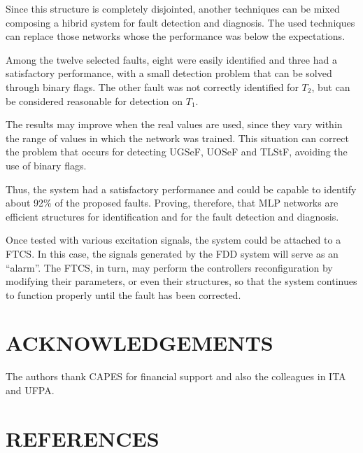 \documentclass[10pt,fleqn,a4paper]{article}
\begin{document}
Since this structure is completely disjointed, another techniques can be mixed
composing a hibrid system for fault detection and diagnosis. The used techniques
can replace those networks whose the performance was below the expectations.

Among the twelve selected faults, eight were easily identified and three had a
satisfactory performance, with a small detection problem that can be solved
through binary flags. The other fault was not correctly identified for $T_2$,
but can be considered reasonable for detection on $T_1$.

The results may improve when the real values are used, since they vary within
the range of values in which the network was trained. This situation can correct
the problem that occurs for detecting UGSeF, UOSeF and TLStF, avoiding the use
of binary flags.

Thus, the system had a satisfactory performance and could be capable to identify
about 92\% of the proposed faults. Proving, therefore, that MLP networks are
efficient structures for identification and for the fault detection and
diagnosis.

Once tested with various excitation signals, the system could be attached to a
FTCS. In this case, the signals generated by the FDD system will serve as an
``alarm''. The FTCS, in turn, may perform the controllers reconfiguration by
modifying their parameters, or even their structures, so that the system
continues to function properly until the fault has been corrected.

\section{ACKNOWLEDGEMENTS}
The authors thank CAPES for financial support and also the colleagues in ITA and
UFPA.

\section{REFERENCES}


\renewcommand{\refname}{}

\end{document}
